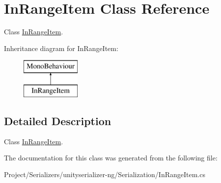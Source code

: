 \hypertarget{class_in_range_item}{}\section{In\+Range\+Item Class Reference}
\label{class_in_range_item}


Class \hyperlink{class_in_range_item}{In\+Range\+Item}.  


Inheritance diagram for In\+Range\+Item\+:\begin{figure}[H]
\begin{center}
\leavevmode
\includegraphics[height=2.000000cm]{class_in_range_item}
\end{center}
\end{figure}


\subsection{Detailed Description}
Class \hyperlink{class_in_range_item}{In\+Range\+Item}. 



The documentation for this class was generated from the following file\+:\begin{DoxyCompactItemize}
\item 
Project/\+Serializers/unityserializer-\/ng/\+Serialization/In\+Range\+Item.\+cs\end{DoxyCompactItemize}
